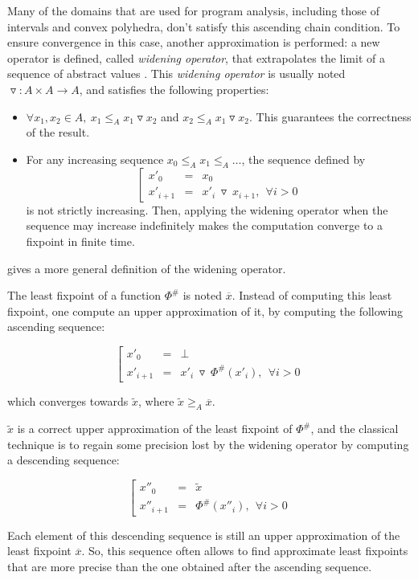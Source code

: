 \documentclass[a4paper,english,titlepage,11pt]{report}
\newcommand*\system[1]{\left[ \begin{array}{lllll}#1 \end{array}\right.}
\newcommand{\widening}{\mathop{\triangledown}}
\begin{document}
Many of the domains that are used for program analysis, including those of intervals and convex polyhedra, don't satisfy this ascending chain condition. To ensure convergence in this case, another approximation
is performed: a new operator is defined, called \emph{widening operator}, that
extrapolates the limit of a sequence of abstract values
\cite{CC77,CousotCousot92-4}. This \emph{widening
operator} is usually noted $\widening: A \times A \rightarrow A$, and satisfies
the following properties:

\begin{itemize}
\item $\forall x_1, x_2 \in A,\ x_1 \leq_A x_1 \widening x_2$ and $x_2 \leq_A x_1
\widening x_2$. This guarantees the correctness of the result.
\item For any increasing sequence $x_0 \leq_A x_1 \leq_A \dots$, the sequence
defined by 
$$\system{
x'_0 & = &  x_0 \\
x'_{i+1} & = &  x'_i\ \widening\ x_{i+1},\ \  \forall i > 0
}$$
is not strictly increasing. Then, applying the widening operator when the
sequence may increase indefinitely makes the computation converge to a fixpoint
in finite time. 
\end{itemize}

\cite{Monniaux_HOSC09} gives a more general definition of the widening operator.

The least fixpoint of a function $\Phi^\#$ is noted $\overline{x}$.
Instead of computing this least fixpoint,
one compute an upper approximation of it, by computing the following ascending
sequence:

$$\system{
x'_0 &=& \perp \\
x'_{i+1} &=& x'_i\ \widening\ \Phi^\#(x'_i),\ \ \forall i > 0
}$$

which converges towards $\tilde{x}$, where $\tilde{x} \geq_A \overline{x}$.

$\tilde{x}$ is a correct upper approximation of the least fixpoint of $\Phi^\#$,
and the classical technique is to regain some precision lost by the widening
operator by computing a descending sequence:

$$\system{
x''_0 &=& \tilde{x} \\
x''_{i+1} &=& \Phi^\#(x''_i), \ \ \forall i > 0
}$$

Each element of this descending sequence is still an upper approximation of the
least fixpoint $\overline{x}$. So, this sequence often allows to find
approximate least fixpoints that are more precise than the one obtained after
the ascending sequence.
\end{document}
